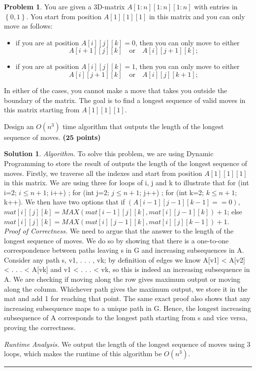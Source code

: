 \documentclass{article}
\theoremstyle{definition}
\newtheorem{problem}{Problem}
\def\fline{\rule{0.75\linewidth}{0.5pt}}
\newcommand{\finishline}{\begin{center}\fline\end{center}}
\newtheorem*{solution*}{Solution}
\newenvironment{solution}{\begin{solution*}}{{\finishline} \end{solution*}}
\newcommand{\grade}[1]{\hfill{\textbf{($\mathbf{#1}$ points)}}}
\newcommand{\set}[1]{\ensuremath{\left\{ #1 \right\}}}
\begin{document}
\begin{problem}
	You are given a 3D-matrix $A[1:n][1:n][1:n]$ with entries in $\set{0,1}$.  You start from position $A[1][1][1]$ in this matrix and you can only move as follows: 
	
	\begin{itemize}
	\item if you are at position $A[i][j][k] = 0$, then you can only move to either
	\[
	A[i+1][j][k] \quad \text{or} \quad A[i][j+1][k];
	\]
	 \item  if you are at position $A[i][j][k] = 1$, then you can only move to either
	 \[
	 	A[i][j+1][k] \quad \text{or} \quad A[i][j][k+1];
	 \]
	 \end{itemize}
	In either of the cases, you cannot make a move that takes you outside the boundary of the matrix. 
	 The goal is to find a longest sequence of valid moves in this matrix starting from $A[1][1][1]$. 
	 
	 Design an $O(n^3)$ time algorithm that outputs the length of the longest sequence of moves.  \grade{25}
\end{problem}

\begin{solution}

	\emph{Algorithm.} To solve this problem, we are using Dynamic Programming to store the result of outputs the length of the longest sequence of moves. Firstly, we traverse all the indexes and start from position $A[1][1][1]$ in this matrix. We are using three for loops of i, j and k to illustrate that  for (int i=2; $i \leq n+1$; i++) ; for (int j=2; $j \leq n+1$; j++) ; for (int k=2; $k \leq n+1$; k++). We then have two options that if $(A[i-1][j-1][k-1]==0)$, $mat[i][j][k]=MAX(mat[i-1][j][k], mat[i][j-1][k])+1$; else $mat[i][j][k]=MAX(mat[i][j-1][k], mat[i][j][k-1])+1$.  \\
	
	\emph{Proof of Correctness.}  We need to argue that the answer to the length of the longest sequence of moves. We do so by showing that there is a one-to-one correspondence between paths leaving s in G and increasing subsequences in A. Consider any path s, v1, . . . , vk; by definition of edges we know A[v1] < A[v2] < . . . < A[vk] and v1 < . . . < vk, so this is indeed an increasing subsequence in A. We are checking if moving along the row gives maximum output or moving along the column. Whichever path gives the maximum output, we store it in the mat and add 1 for reaching that point. The same exact proof also shows that any increasing subsequence maps to a unique path in G. Hence, the longest increasing subsequence of A corresponds to the longest path starting from s and vice versa, proving the correctness.


	\emph{Runtime Analysis.} We output the length of the longest sequence of moves using 3 loops, which makes the runtime of this algorithm be $O(n^3)$. \\
	
\end{solution}
\end{document}

